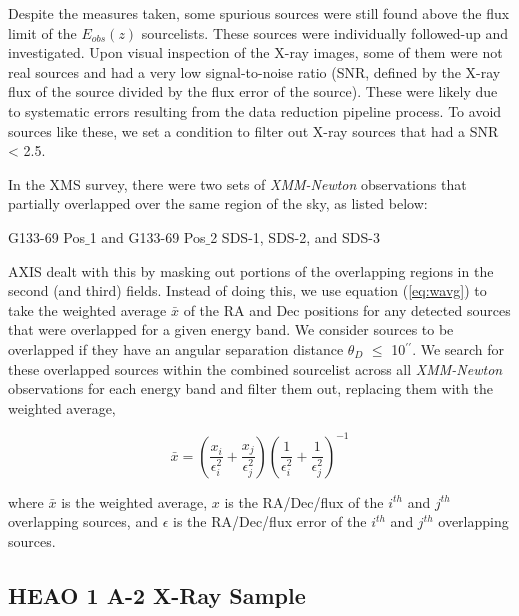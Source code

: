 \documentclass[fleqn,usenatbib]{mnras}
\begin{document}
    Despite the measures taken, some spurious sources were still found above the flux limit of the $E_{obs}(z)$ sourcelists.
    These sources were individually followed-up and investigated.
    Upon visual inspection of the X-ray images, some of them were not real sources and had a very low signal-to-noise ratio (SNR, defined by the X-ray flux of the source divided by the flux error of the source).
    These were likely due to systematic errors resulting from the data reduction pipeline process.
    To avoid sources like these, we set a condition to filter out X-ray sources that had a SNR < 2.5.
    
    In the XMS survey, there were two sets of \textit{XMM-Newton} observations that partially overlapped over the same region of the sky, as listed below:
    \begin{outline}
        \1 G133-69 Pos$\_$1 and G133-69 Pos$\_$2
        \1 SDS-1, SDS-2, and SDS-3
    \end{outline}
    
    \noindent AXIS dealt with this by masking out portions of the overlapping regions in the second (and third) fields.
    Instead of doing this, we use equation (\ref{eq:wavg}) to take the weighted average $\bar{x}$ of the RA and Dec positions for any detected sources that were overlapped for a given energy band.
    We consider sources to be overlapped if they have an angular separation distance $\theta_{D}$ $\leq$ 10$^{\prime\prime}$.
    We search for these overlapped sources within the combined sourcelist across all \textit{XMM-Newton} observations for each energy band and filter them out, replacing them with the weighted average,
    
		\begin{equation}\label{eq:wavg}
		\bar{x} = \left( \frac{x_{i}}{\epsilon_{i}^{2}} + \frac{x_{j}}{\epsilon_{j}^{2}} \right) \left( \frac{1}{\epsilon_{i}^{2}} + \frac{1}{\epsilon_{j}^{2}} \right)^{-1}
		\end{equation}
	
	\noindent where $\bar{x}$ is the weighted average, $x$ is the RA/Dec/flux of the $i^{th}$ and $j^{th}$ overlapping sources, and $\epsilon$ is the RA/Dec/flux error of the $i^{th}$ and $j^{th}$ overlapping sources.
	
	
	
	\subsection{HEAO 1 A-2 X-Ray Sample}\label{subsec:heao1survey}  
    
\end{document}
